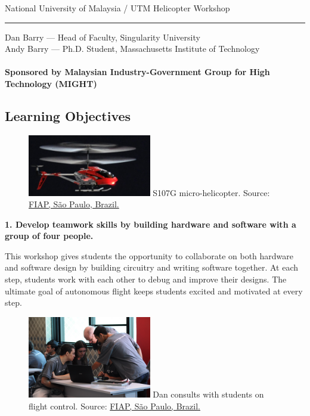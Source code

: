 \documentclass[11pt]{article}
\begin{document}
\thispagestyle{empty}
\pagestyle{empty}

{\LARGE National University of Malaysia / UTM Helicopter Workshop}
\hrule
Dan Barry --- Head of Faculty, Singularity University \\
Andy Barry --- Ph.D. Student, Massachusetts Institute of Technology
\\ \\
\textbf{\large Sponsored by Malaysian Industry-Government Group for High Technology (MIGHT)}

\subsection*{Learning Objectives}

\begin{figure}
    \begin{center}
    \includegraphics[width=0.48\textwidth]{figures/S107G.jpg}
    {\small S107G micro-helicopter. Source: \href{http://www.fiap.com.br}{FIAP, S\~ao Paulo, Brazil.}}
    \end{center}
    \vspace{-20pt}
\end{figure}
\textbf{1. Develop teamwork skills by building hardware and software with a group of four people.}

This workshop gives students the opportunity to collaborate on both hardware and software design by building circuitry and writing software together.  At each step, students work with each other to debug and improve their designs.  The ultimate goal of autonomous flight keeps students excited and motivated at every step.

\vspace{20pt}
\begin{figure}
    \begin{center}
    \includegraphics[width=0.48\textwidth]{figures/fiap_workshop_dan.jpg}
    {\small Dan consults with students on flight control.  Source: \href{http://www.fiap.com.br}{FIAP, S\~ao Paulo, Brazil.}}
    \end{center}
    \vspace{-20pt}
\end{figure}
\end{document}
